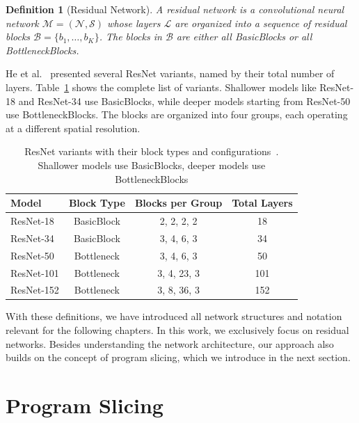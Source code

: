 \documentclass[
12pt,
fancyheadings,
a4paper,
twoside,
BCOR=0.7cm,
nobcorignoretitle,
grayscalebody,
]{stsreprt}
\newtheorem{definition}{Definition}[chapter]
\begin{document}
\begin{definition}[Residual Network]
\label{def:resnet}
A residual network is a convolutional neural network $\mathcal{M} = (\mathcal{N}, \mathcal{S})$
whose layers $\mathcal{L}$ are organized into a sequence of residual blocks $\mathcal{B} = \{b_1,
\dots, b_K\}$.
The blocks in $\mathcal{B}$ are either all BasicBlocks or all BottleneckBlocks.
\end{definition}

He et al.~\cite{he2016deep} presented several ResNet variants, named by their total number of
layers.
Table~\ref{tab:resnet_variants} shows the complete list of variants.
Shallower models like ResNet-18 and ResNet-34 use BasicBlocks, while deeper models starting from
ResNet-50 use BottleneckBlocks.
The blocks are organized into four groups, each operating at a different spatial resolution.

\begin{table}[ht]
    \centering
    \begin{tabular}{lccc}
        \toprule
                Model & Block Type & Blocks per Group & Total Layers \\
        \midrule
                ResNet-18 & BasicBlock & 2, 2, 2, 2 & 18 \\
                ResNet-34 & BasicBlock & 3, 4, 6, 3 & 34 \\
                ResNet-50 & Bottleneck & 3, 4, 6, 3 & 50 \\
                ResNet-101 & Bottleneck & 3, 4, 23, 3 & 101 \\
                ResNet-152 & Bottleneck & 3, 8, 36, 3 & 152 \\
        \bottomrule
    \end{tabular}
    \caption{ResNet variants with their block types and configurations~\cite{he2016deep}. Shallower models use BasicBlocks, deeper models use BottleneckBlocks}
    \label{tab:resnet_variants}
\end{table}

With these definitions, we have introduced all network structures and notation relevant for the
following chapters. In this work, we exclusively focus on residual networks.
Besides understanding the network architecture, our approach also builds on the concept of program
slicing, which we introduce in the next section.

\section{Program Slicing}
\end{document}
